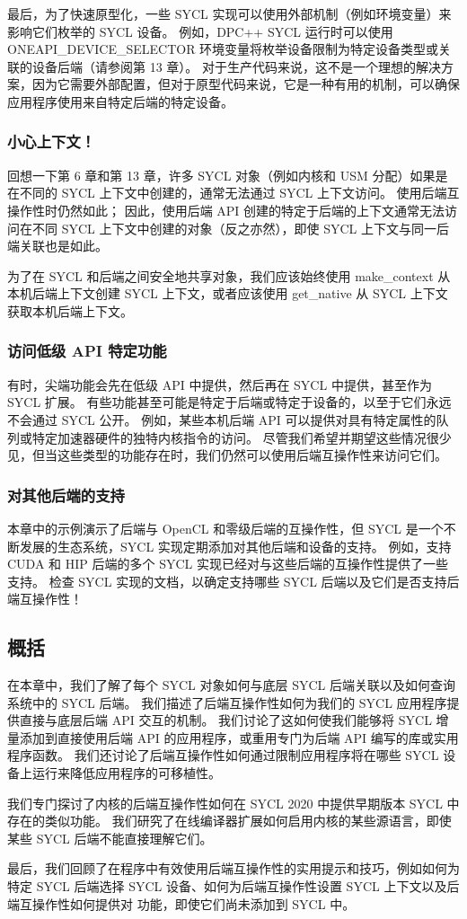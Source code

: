 最后，为了快速原型化，一些 SYCL 实现可以使用外部机制（例如环境变量）来影响它们枚举的 SYCL 设备。 例如，DPC++ SYCL 运行时可以使用 ONEAPI\_DEVICE\_SELECTOR 环境变量将枚举设备限制为特定设备类型或关联的设备后端（请参阅第 13 章）。 对于生产代码来说，这不是一个理想的解决方案，因为它需要外部配置，但对于原型代码来说，它是一种有用的机制，可以确保应用程序使用来自特定后端的特定设备。

\subsubsection{小心上下文！}
回想一下第 6 章和第 13 章，许多 SYCL 对象（例如内核和 USM 分配）如果是在不同的 SYCL 上下文中创建的，通常无法通过 SYCL 上下文访问。 使用后端互操作性时仍然如此； 因此，使用后端 API 创建的特定于后端的上下文通常无法访问在不同 SYCL 上下文中创建的对象（反之亦然），即使 SYCL 上下文与同一后端关联也是如此。

为了在 SYCL 和后端之间安全地共享对象，我们应该始终使用 make\_context 从本机后端上下文创建 SYCL 上下文，或者应该使用 get\_native 从 SYCL 上下文获取本机后端上下文。

\subsubsection{访问低级 API 特定功能}
有时，尖端功能会先在低级 API 中提供，然后再在 SYCL 中提供，甚至作为 SYCL 扩展。 有些功能甚至可能是特定于后端或特定于设备的，以至于它们永远不会通过 SYCL 公开。 例如，某些本机后端 API 可以提供对具有特定属性的队列或特定加速器硬件的独特内核指令的访问。 尽管我们希望并期望这些情况很少见，但当这些类型的功能存在时，我们仍然可以使用后端互操作性来访问它们。

\subsubsection{对其他后端的支持}
本章中的示例演示了后端与 OpenCL 和零级后端的互操作性，但 SYCL 是一个不断发展的生态系统，SYCL 实现定期添加对其他后端和设备的支持。 例如，支持 CUDA 和 HIP 后端的多个 SYCL 实现已经对与这些后端的互操作性提供了一些支持。 检查 SYCL 实现的文档，以确定支持哪些 SYCL 后端以及它们是否支持后端互操作性！

\subsection{概括}
在本章中，我们了解了每个 SYCL 对象如何与底层 SYCL 后端关联以及如何查询系统中的 SYCL 后端。 我们描述了后端互操作性如何为我们的 SYCL 应用程序提供直接与底层后端 API 交互的机制。 我们讨论了这如何使我们能够将 SYCL 增量添加到直接使用后端 API 的应用程序，或重用专门为后端 API 编写的库或实用程序函数。 我们还讨论了后端互操作性如何通过限制应用程序将在哪些 SYCL 设备上运行来降低应用程序的可移植性。

我们专门探讨了内核的后端互操作性如何在 SYCL 2020 中提供早期版本 SYCL 中存在的类似功能。 我们研究了在线编译器扩展如何启用内核的某些源语言，即使某些 SYCL 后端不能直接理解它们。

最后，我们回顾了在程序中有效使用后端互操作性的实用提示和技巧，例如如何为特定 SYCL 后端选择 SYCL 设备、如何为后端互操作性设置 SYCL 上下文以及后端互操作性如何提供对 功能，即使它们尚未添加到 SYCL 中。